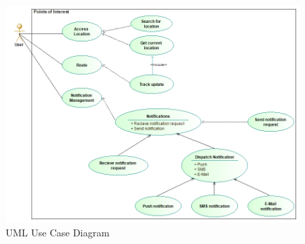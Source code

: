 	\begin{figure}[H]\includegraphics[width=\textwidth]{UseCaseDiagram}
	\caption{UML Use Case Diagram}
	\end{figure}
	
